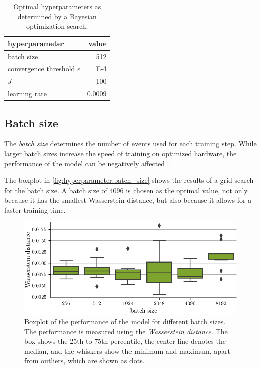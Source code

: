 \begin{table}
    \centering
    \caption{
      Optimal hyperparameters as determined by a Bayesian optimization search.
    }
    \label{tab:hyperparameters:initial}
    \begin{tabular}{l r}
        \toprule
        hyperparameter & {value} \\
        \midrule
        batch size & \num{512} \\
        convergence threshold $\epsilon$ & \num{E-4} \\
        $J$ & \num{100} \\
        learning rate & \num{0.0009} \\
        \bottomrule
    \end{tabular}
\end{table}


\FloatBarrier
\subsection{Batch size}
The \emph{batch size} determines the number of events used for each training step.
While larger batch sizes increase the speed of training
on optimized hardware,
the performance of the model can be negatively affected \cite{batchsize_kandel}.

The boxplot in \autoref{fig:hyperparameter:batch_size} shows the results of a grid search for the batch size.
A batch size of \num{4096} is chosen as the optimal value,
not only because it has the smallest Wasserstein distance,
but also because it allows for a faster training time.

\begin{figure}
  \centering
  \includegraphics[scale=1]{content/plots/hyperparam/batch_size_vs_wd_boxplot_lessheight.pdf}
  \caption{Boxplot of the performance of the model for different batch sizes.
    The performance is measured using the \emph{Wasserstein distance}.
    The box shows the 25th to 75th percentile,
    the center line denotes the median,
    and the whiskers show the minimum and maximum,
      apart from outliers,
        which are shown as dots.
  }
  \label{fig:hyperparameter:batch_size}
\end{figure}


